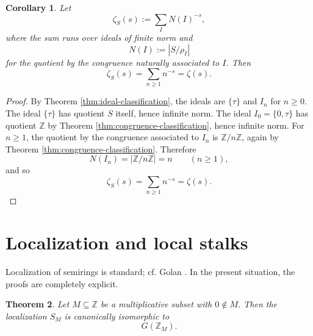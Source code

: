 \documentclass[11pt]{article}
\newtheorem{theorem}{Theorem}[section]
\newtheorem{corollary}[theorem]{Corollary}
\theoremstyle{definition}
\newcommand{\Z}{\mathbb Z}
\newcommand{\taup}{\tau}
\newcommand{\ideal}[1]{I_{#1}}
\begin{document}
\begin{corollary}\label{cor:zeta}
Let
\[
\zeta_S(s):=\sum_I N(I)^{-s},
\]
where the sum runs over ideals of finite norm and
\[
N(I):=|S/\rho_I|
\]
for the quotient by the congruence naturally associated to \(I\).  Then
\[
\zeta_S(s)=\sum_{n\ge1} n^{-s}=\zeta(s).
\]
\end{corollary}

\begin{proof}
By Theorem \ref{thm:ideal-classification}, the ideals are \(\{\taup\}\) and \(\ideal{n}\) for \(n\ge0\).  The ideal \(\{\taup\}\) has quotient \(S\) itself, hence infinite norm.  The ideal \(\ideal{0}=\{0,\taup\}\) has quotient \(\Z\) by Theorem \ref{thm:congruence-classification}, hence infinite norm.  For \(n\ge1\), the quotient by the congruence associated to \(\ideal{n}\) is \(\Z/n\Z\), again by Theorem \ref{thm:congruence-classification}.  Therefore
\[
N(\ideal{n})=|\Z/n\Z|=n\qquad (n\ge1),
\]
and so
\[
\zeta_S(s)=\sum_{n\ge1} n^{-s}=\zeta(s).
\]
\end{proof}

\section{Localization and local stalks}

Localization of semirings is standard; cf. Golan \cite[Ch.~17]{golan}.  In the present situation, the proofs are completely explicit.

\begin{theorem}\label{thm:localization-away-from-zero}
Let \(M\subseteq \Z\) be a multiplicative subset with \(0\notin M\).  Then the localization \(S_M\) is canonically isomorphic to
\[
G(\Z_M).
\]
\end{theorem}
\end{document}
